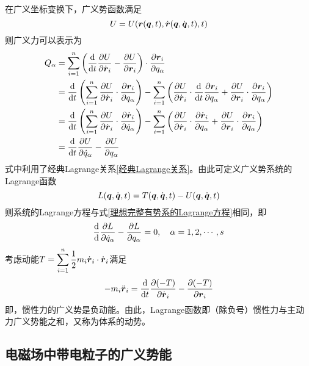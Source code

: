 在广义坐标变换下，广义势函数满足
\begin{equation*}
	U = U(\boldsymbol{r}(\boldsymbol{q},t),\dot{\boldsymbol{r}}(\boldsymbol{q},\dot{\boldsymbol{q}},t),t)
\end{equation*}
则广义力可以表示为
\begin{align}
	Q_\alpha & = \sum_{i=1}^n \left(\frac{\mathrm{d}}{\mathrm{d} t} \frac{\partial U}{\partial \dot{\boldsymbol{r}}_i} - \frac{\partial U}{\partial \boldsymbol{r}_i}\right) \cdot \frac{\partial \boldsymbol{r}_i}{\partial q_\alpha} \nonumber \\
	& = \frac{\mathrm{d}}{\mathrm{d} t} \left(\sum_{i=1}^n \frac{\partial U}{\partial \dot{\boldsymbol{r}}_i} \cdot \frac{\partial \boldsymbol{r}_i}{\partial q_\alpha} \right) - \sum_{i=1}^n \left(\frac{\partial U}{\partial \dot{\boldsymbol{r}}_i} \cdot \frac{\mathrm{d}}{\mathrm{d} t} \frac{\partial \boldsymbol{r}_i}{\partial q_\alpha} + \frac{\partial U}{\partial \boldsymbol{r}_i} \cdot \frac{\partial \boldsymbol{r}_i}{\partial q_\alpha}\right) \nonumber \\
	& = \frac{\mathrm{d}}{\mathrm{d} t} \left(\sum_{i=1}^n \frac{\partial U}{\partial \dot{\boldsymbol{r}}_i} \cdot \frac{\partial \dot{\boldsymbol{r}}_i}{\partial \dot{q}_\alpha} \right) - \sum_{i=1}^n \left(\frac{\partial U}{\partial \dot{\boldsymbol{r}}_i} \cdot \frac{\partial \dot{\boldsymbol{r}}_i}{\partial q_\alpha} + \frac{\partial U}{\partial \boldsymbol{r}_i} \cdot \frac{\partial \boldsymbol{r}_i}{\partial q_\alpha}\right) \nonumber \\
	& = \frac{\mathrm{d}}{\mathrm{d} t} \frac{\partial U}{\partial \dot{q}_\alpha} - \frac{\partial U}{\partial q_\alpha}
	\label{广义势系统中的广义力}
\end{align}
式中利用了经典Lagrange关系\eqref{经典Lagrange关系}。由此可定义广义势系统的Lagrange函数
\begin{equation}
	L(\boldsymbol{q},\dot{\boldsymbol{q}},t) = T(\boldsymbol{q},\dot{\boldsymbol{q}},t) - U(\boldsymbol{q},\dot{\boldsymbol{q}},t)
\end{equation}
则系统的Lagrange方程与式\eqref{理想完整有势系的Lagrange方程}相同，即
\begin{equation}
	\frac{\mathrm{d}}{\mathrm{d}} \frac{\partial L}{\partial \dot{q}_\alpha} - \frac{\partial L}{\partial q_\alpha} = 0,\quad \alpha = 1,2,\cdots,s
\end{equation}
考虑动能$\displaystyle T = \sum_{i=1}^n \frac12 m_i \dot{\boldsymbol{r}}_i \cdot \dot{\boldsymbol{r}}_i$满足
\begin{equation*}
	-m_i \ddot{\boldsymbol{r}}_i = \frac{\mathrm{d}}{\mathrm{d} t} \frac{\partial (-T)}{\partial \dot{\boldsymbol{r}}_i} - \frac{\partial (-T)}{\partial \boldsymbol{r}_i}
\end{equation*}
即，惯性力的广义势是负动能。由此，Lagrange函数即（除负号）惯性力与主动力广义势能之和，又称为体系的{\heiti 动势}。

\subsection{电磁场中带电粒子的广义势能}


